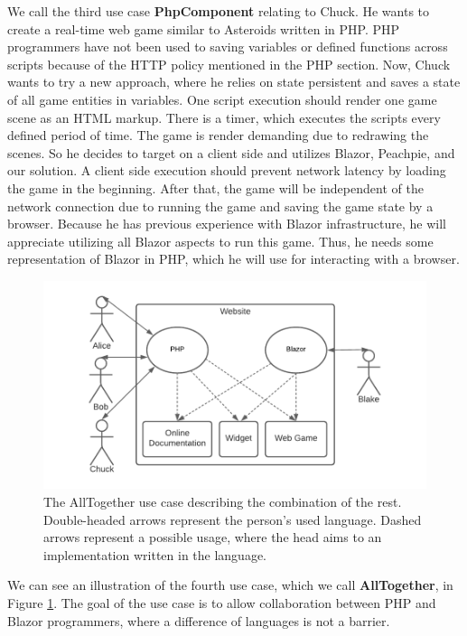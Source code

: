 We call the third use case \textbf{PhpComponent} relating to Chuck.
He wants to create a real-time web game similar to Asteroids written in PHP.
PHP programmers have not been used to saving variables or defined functions across scripts because of the HTTP policy mentioned in the PHP section.
Now, Chuck wants to try a new approach, where he relies on state persistent and saves a state of all game entities in variables.
One script execution should render one game scene as an HTML markup.
There is a timer, which executes the scripts every defined period of time.
The game is render demanding due to redrawing the scenes.
So he decides to target on a client side and utilizes Blazor, Peachpie, and our solution.
A client side execution should prevent network latency by loading the game in the beginning.
After that, the game will be independent of the network connection due to running the game and saving the game state by a browser. 
Because he has previous experience with Blazor infrastructure, he will appreciate utilizing all Blazor aspects to run this game.
Thus, he needs some representation of Blazor in PHP, which he will use for interacting with a browser.
\par
\begin{figure}[t]\centering
\includegraphics[scale=0.8]{./img/UseCaseAllTogether}
\caption{The AllTogether use case describing the combination of the rest. Double-headed arrows represent the person's used language. Dashed arrows represent a possible usage, where the head aims to an implementation written in the language.}
\label{img09:usecase}
\end{figure} 
\par
We can see an illustration of the fourth use case, which we call \textbf{AllTogether}, in Figure \ref{img09:usecase}.
The goal of the use case is to allow collaboration between PHP and Blazor programmers, where a difference of languages is not a barrier.  
